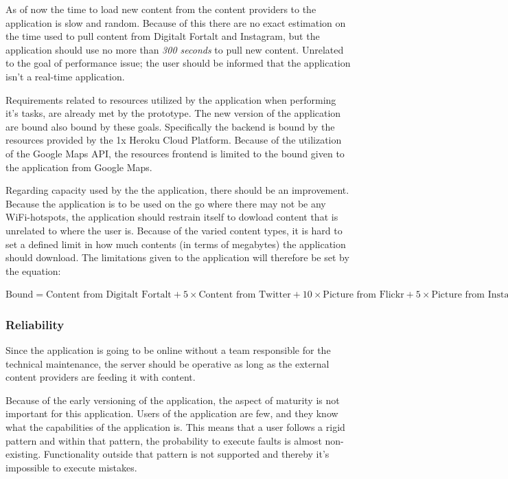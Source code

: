 As of now the time to load new content from the content providers to the application is slow and random. Because of this there are no exact estimation on the time used to pull content from Digitalt Fortalt and Instagram, but the application should use no more than \textit{300 seconds} to pull new content. Unrelated to the goal of performance issue; the user should be informed that the application isn't a real-time application.

Requirements related to resources utilized by the application when performing it's tasks, are already met by the prototype. The new version of the application are bound also bound by these goals. Specifically the backend is bound by the resources provided by the 1x Heroku Cloud Platform. Because of the utilization of the Google Maps API, the resources frontend is limited to the bound given to the application from Google Maps. 

Regarding capacity used by the the application, there should be an improvement. Because the application is to be used on the go where there may not be any WiFi-hotspots, the application should restrain itself to dowload content that is unrelated to where the user is. Because of the varied content types, it is hard to set a defined limit in how much contents (in terms of megabytes) the application should download. The limitations given to the application will therefore be set by the equation: \\ 
\begin{center} 
$\textrm{Bound}=\textrm{Content from Digitalt Fortalt}+5\times\textrm{Content from Twitter}+10\times\textrm{Picture from Flickr}+5\times\textrm{Picture from Instagram}$
\end{center}

\subsubsection{Reliability}
Since the application is going to be online without a team responsible for the technical maintenance, the server should be operative as long as the external content providers are feeding it with content. 

Because of the early versioning of the application, the aspect of maturity is not important for this application. Users of the application are few, and they know what the capabilities of the application is. This means that a user follows a rigid pattern and within that pattern, the probability to execute faults is almost non-existing. Functionality outside that pattern is not supported and thereby it's impossible to execute mistakes.

